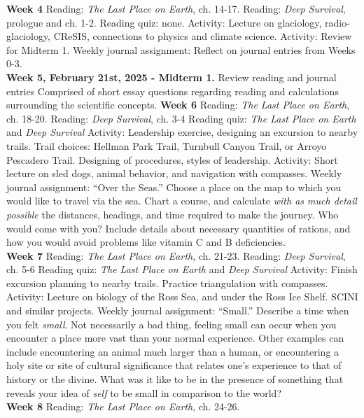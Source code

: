 \documentclass[10pt]{article}
\begin{document}
\begin{outline}[enumerate]
\clearpage
\1 \textbf{Week 4}
\2 Reading: \textit{The Last Place on Earth}, ch. 14-17.
\2 Reading: \textit{Deep Survival}, prologue and ch. 1-2.
\2 Reading quiz: none.
\2 Activity: Lecture on glaciology, radio-glaciology, CReSIS, connections to physics and climate science.
\2 Activity: Review for Midterm 1.
\2 Weekly journal assignment: Reflect on journal entries from Weeks 0-3. \\
\1 \textbf{Week 5, February 21st, 2025 - Midterm 1.}
\2 Review reading and journal entries
\2 Comprised of short essay questions regarding reading and calculations surrounding the scientific concepts.
\1 \textbf{Week 6}
\2 Reading: \textit{The Last Place on Earth}, ch. 18-20.
\2 Reading: \textit{Deep Survival}, ch. 3-4
\2 Reading quiz: \textit{The Last Place on Earth} and \textit{Deep Survival}
\2 Activity: Leadership exercise, designing an excursion to nearby trails. Trail choices: Hellman Park Trail, Turnbull Canyon Trail, or Arroyo Pescadero Trail. Designing of procedures, styles of leadership.
\2 Activity: Short lecture on sled dogs, animal behavior, and navigation with compasses.
\2 Weekly journal assignment: ``Over the Seas.''  Choose a place on the map to which you would like to travel via the sea.  Chart a course, and calculate \textit{with as much detail possible} the distances, headings, and time required to make the journey.  Who would come with you?  Include details about necessary quantities of rations, and how you would avoid problems like vitamin C and B deficiencies. \\
\1 \textbf{Week 7}
\2 Reading: \textit{The Last Place on Earth}, ch. 21-23.
\2 Reading: \textit{Deep Survival}, ch. 5-6
\2 Reading quiz: \textit{The Last Place on Earth} and \textit{Deep Survival}
\2 Activity: Finish excursion planning to nearby trails.  Practice triangulation with compasses.
\2 Activity: Lecture on biology of the Ross Sea, and under the Ross Ice Shelf. SCINI and similar projects.
\2 Weekly journal assignment: ``Small.'' Describe a time when you felt \textit{small}.  Not necessarily a bad thing, feeling small can occur when you encounter a place more vast than your normal experience.  Other examples can include encountering an animal much larger than a human, or encountering a holy site or site of cultural significance that relates one's experience to that of history or the divine.  What was it like to be in the presence of something that reveals your idea of \textit{self} to be small in comparison to the world? \\
\1 \textbf{Week 8}
\2 Reading: \textit{The Last Place on Earth}, ch. 24-26.

\end{outline}
\end{document}
